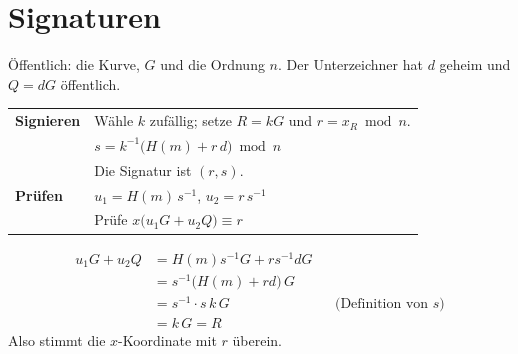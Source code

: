 \section{Signaturen}

\begin{merksatz}
Öffentlich: die Kurve, $G$ und die Ordnung $n$. Der Unterzeichner hat $d$ geheim und $Q = dG$ öffentlich.

\begin{center}
{\small
\renewcommand{\arraystretch}{1.52}
\begin{tabular}{@{}P{2.0cm}P{6.6cm}@{}}
\toprule
\textbf{Signieren} & Wähle $k$ zufällig; setze $R = kG$ und $r = x_R \bmod n$.\\
& $s = k^{-1}\bigl(H(m)+r\,d\bigr) \bmod n$\\
& Die Signatur ist $(r,s)$.\\
\midrule
\textbf{Prüfen} & $u_1 = H(m)\,s^{-1}$, $u_2 = r\,s^{-1}$\\
& Prüfe $x\bigl(u_1G+u_2Q\bigr) \equiv r$\\
\bottomrule
\end{tabular}}
\end{center}

\begin{align*}
u_1 G + u_2 Q &= H(m)s^{-1}G + r s^{-1} d G\\
&= s^{-1}\bigl(H(m)+rd\bigr)\,G\\
&= s^{-1}\cdot s\,k\,G && \text{(Definition von } s)\\
&= k\,G = R
\end{align*}
Also stimmt die $x$-Koordinate mit $r$ überein. \checkmark

\begin{center}
\begin{minipage}{0.88\textwidth}
\end{minipage}
\end{center}
\end{merksatz}

